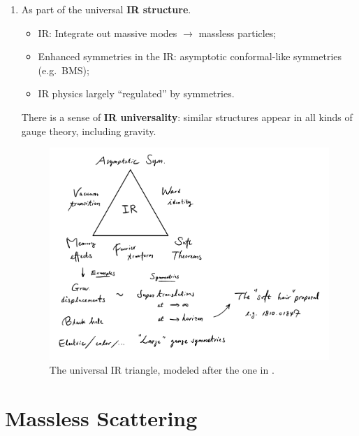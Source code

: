 \documentclass[a4paper
	,10pt
]{article}
\begin{document}
\begin{enumerate}
	
	\item As part of the universal \textbf{IR structure}. 
	
	\begin{itemize}[noitemsep]
	\item IR: Integrate out massive modes $\to$ massless particles;
	
	\item Enhanced symmetries in the IR: asymptotic conformal-like symmetries (e.g.~BMS);
	
	\item IR physics largely ``regulated'' by symmetries.
	
	\end{itemize}
	
	There is a sense of \textbf{IR universality}: similar structures appear in all kinds of gauge theory, including gravity. 
	
	\begin{figure}[!h]
	\centering
	\includegraphics[width=.7\linewidth]{img/IRtriangle.pdf}
	\caption[The universal IR triangle]{
		The universal IR triangle, modeled after the one in \cite{Strominger:2017zoo}. 
	}
	\end{figure}
	
	\end{enumerate}
	
\section{Massless Scattering}
	
\end{document}
